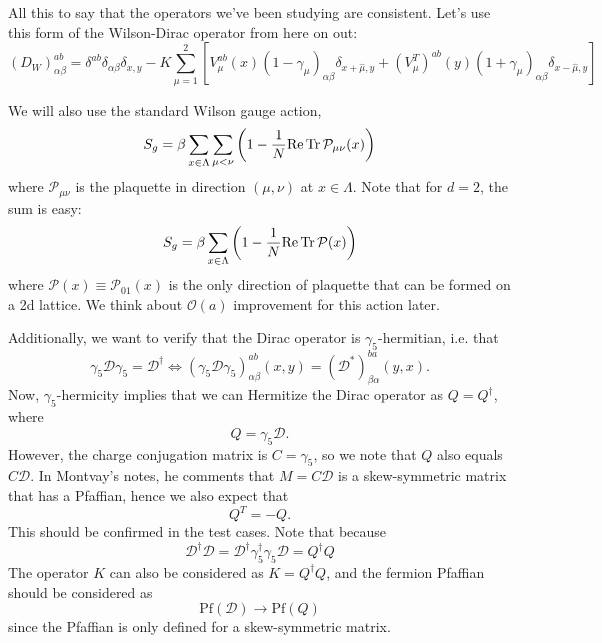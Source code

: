 All this to say that the operators we've been studying are consistent. Let's use this form of the Wilson-Dirac operator from here on out:
\begin{equation}
\boxed{
	(D_W)_{\alpha\beta}^{ab} = \delta^{ab} \delta_{\alpha\beta} \delta_{x, y} - K \sum_{\mu = 1}^2 \left[ V_\mu^{ab}(x) (1 - \gamma_\mu)_{\alpha\beta} \delta_{x + \hat\mu, y} + (V_{\mu}^T)^{ab}(y) (1 + \gamma_\mu)_{\alpha\beta} \delta_{x - \hat\mu, y} \right]
}
\end{equation}

We will also use the standard Wilson gauge action,
\begin{equation}
	S_g = \beta \sum_{x\in\Lambda}\sum_{\mu < \nu} \left( 1 - \frac{1}{N} \mathrm{Re}\, \mathrm{Tr}\, \mathcal P_{\mu\nu}(x) \right)
\end{equation}
where $\mathcal P_{\mu\nu}$ is the plaquette in direction $(\mu, \nu)$ at $x\in\Lambda$. Note that for $d = 2$, the sum is easy:
\begin{equation}
	S_g = \beta \sum_{x\in\Lambda} \left( 1 - \frac{1}{N} \mathrm{Re}\, \mathrm{Tr}\, \mathcal P(x) \right)
\end{equation}
where $\mathcal P(x)\equiv \mathcal P_{01}(x)$ is the only direction of plaquette that can be formed on a 2d lattice. We think about $\mathcal O(a)$ improvement for this action later. 

Additionally, we want to verify that the Dirac operator is $\gamma_5$-hermitian, i.e. that
\begin{equation}
	\gamma_5 \mathcal D \gamma_5 = \mathcal D^\dagger \iff (\gamma_5 \mathcal D \gamma_5)_{\alpha\beta}^{ab}(x, y) = (\mathcal D^*)_{\beta\alpha}^{ba}(y, x).
\end{equation}
Now, $\gamma_5$-hermicity implies that we can Hermitize the Dirac operator as $Q = Q^\dagger$, where
\begin{equation}
	Q = \gamma_5 \mathcal D.
\end{equation}
However, the charge conjugation matrix is $C = \gamma_5$, so we note that $Q$ also equals $C\mathcal D$. In Montvay's notes, he comments that $M = C\mathcal D$ is a skew-symmetric matrix that has a Pfaffian, hence we also expect that
\begin{equation}
	Q^T = -Q.
\end{equation}
This should be confirmed in the test cases. Note that because 
\begin{equation}
	\mathcal D^\dagger \mathcal D = \mathcal D^\dagger \gamma_5^\dagger \gamma_5 \mathcal D = Q^\dagger Q
\end{equation}
The operator $K$ can also be considered as $K = Q^\dagger Q$, and the fermion Pfaffian should be considered as
\begin{equation}
	\mathrm{Pf}(\mathcal D) \longrightarrow \mathrm{Pf}(Q)
\end{equation}
since the Pfaffian is only defined for a skew-symmetric matrix.

